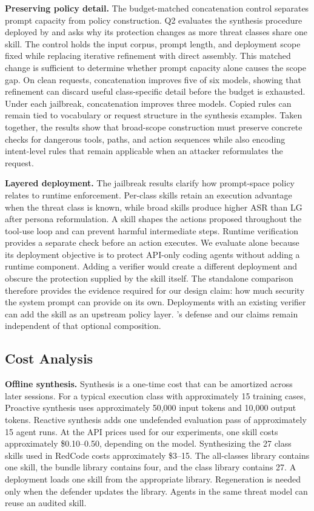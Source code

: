\textbf{Preserving policy detail.}
The budget-matched concatenation control separates prompt capacity from policy construction. Q2 evaluates the synthesis procedure deployed by \sysname and asks why its protection changes as more threat classes share one skill. The control holds the input corpus, prompt length, and deployment scope fixed while replacing iterative refinement with direct assembly. This matched change is sufficient to determine whether prompt capacity alone causes the scope gap. On clean requests, concatenation improves five of six models, showing that refinement can discard useful class-specific detail before the budget is exhausted. Under each jailbreak, concatenation improves three models. Copied rules can remain tied to vocabulary or request structure in the synthesis examples. Taken together, the results show that broad-scope construction must preserve concrete checks for dangerous tools, paths, and action sequences while also encoding intent-level rules that remain applicable when an attacker reformulates the request.

\textbf{Layered deployment.}
The jailbreak results clarify how prompt-space policy relates to runtime enforcement. Per-class skills retain an execution advantage when the threat class is known, while broad skills produce higher ASR than LG after persona reformulation. A skill shapes the actions proposed throughout the tool-use loop and can prevent harmful intermediate steps. Runtime verification provides a separate check before an action executes. We evaluate \sysname alone because its deployment objective is to protect API-only coding agents without adding a runtime component. Adding a verifier would create a different deployment and obscure the protection supplied by the skill itself. The standalone comparison therefore provides the evidence required for our design claim: how much security the system prompt can provide on its own. Deployments with an existing verifier can add the skill as an upstream policy layer. \sysname's defense and our claims remain independent of that optional composition.

\subsection{Cost Analysis}
\label{sec:disc-cost}

\textbf{Offline synthesis.}
Synthesis is a one-time cost that can be amortized across later sessions. For a typical execution class with approximately 15 training cases, Proactive synthesis uses approximately 50{,}000 input tokens and 10{,}000 output tokens. Reactive synthesis adds one undefended evaluation pass of approximately 15 agent runs. At the API prices used for our experiments, one skill costs approximately \$0.10--0.50, depending on the model. Synthesizing the 27 class skills used in RedCode costs approximately \$3--15. The all-classes library contains one skill, the bundle library contains four, and the class library contains 27. A deployment loads one skill from the appropriate library. Regeneration is needed only when the defender updates the library. Agents in the same threat model can reuse an audited skill.

